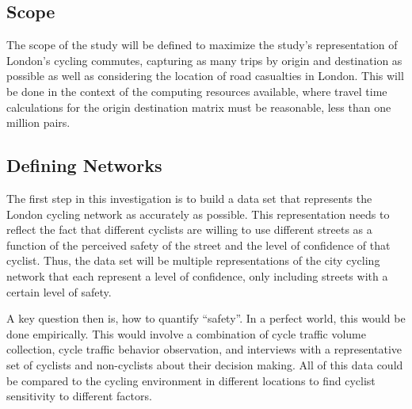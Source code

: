 


\subsection{Scope}

The scope of the study will be defined to maximize the study's representation of London's cycling commutes, capturing as many trips by origin and destination as possible as well as considering the location of road casualties in London. This will be done in the context of the computing resources available, where travel time calculations for the origin destination matrix must be reasonable, less than one million pairs. 

\subsection{Defining Networks}

The first step in this investigation is to build a data set that represents the London cycling network as accurately as possible. This representation needs to reflect the fact that different cyclists are willing to use different streets as a function of the perceived safety of the street and the level of confidence of that cyclist. Thus, the data set will be multiple representations of the city cycling network that each represent a level of confidence, only including streets with a certain level of safety. 

A key question then is, how to quantify ``safety''. In a perfect world, this would be done empirically. This would involve a combination of cycle traffic volume collection, cycle traffic behavior observation, and interviews with a representative set of cyclists and non-cyclists about their decision making. All of this data could be compared to the cycling environment in different locations to find cyclist sensitivity to different factors. 

